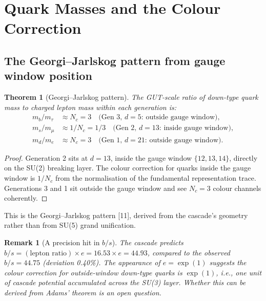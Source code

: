 \documentclass[12pt,a4paper]{article}
\newtheorem{theorem}{Theorem}[section]
\newtheorem*{remark}{Remark}
\begin{document}
\section{Quark Masses and the Colour Correction}\label{sec:quark-mass}

\subsection{The Georgi--Jarlskog pattern from gauge window position}

\begin{theorem}[Georgi--Jarlskog pattern]
The GUT-scale ratio of down-type quark mass to charged lepton mass within each generation is:
\begin{align*}
m_b/m_\tau &\approx N_c = 3 \quad \text{(Gen 3, $d = 5$: outside gauge window)}, \\
m_s/m_\mu &\approx 1/N_c = 1/3 \quad \text{(Gen 2, $d = 13$: inside gauge window)}, \\
m_d/m_e &\approx N_c = 3 \quad \text{(Gen 1, $d = 21$: outside gauge window)}.
\end{align*}
\end{theorem}

\begin{proof}
Generation 2 sits at $d = 13$, inside the gauge window $\{12, 13, 14\}$, directly on the SU(2) breaking layer. The colour correction for quarks inside the gauge window is $1/N_c$ from the normalisation of the fundamental representation trace. Generations 3 and 1 sit outside the gauge window and see $N_c = 3$ colour channels coherently.
\end{proof}

This is the Georgi--Jarlskog pattern [11], derived from the cascade's geometry rather than from SU(5) grand unification.

\begin{remark}[A precision hit in $b/s$]
The cascade predicts $b/s = (\text{lepton ratio}) \times e = 16.53 \times e = 44.93$, compared to the observed $b/s = 44.75$ (deviation 0.40\%). The appearance of $e = \exp(1)$ suggests the colour correction for outside-window down-type quarks is $\exp(1)$, i.e., one unit of cascade potential accumulated across the SU(3) layer. Whether this can be derived from Adams' theorem is an open question.
\end{remark}
\end{document}
